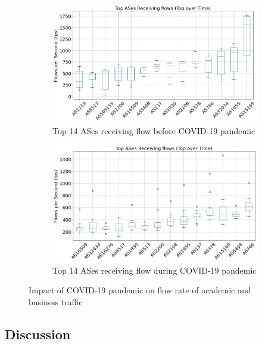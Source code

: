 \documentclass[10pt, journal, letterpaper]{IEEEtran}
\newcommand\linearFigSze{0.48}
\begin{document}
\begin{figure}
    \begin{subfigure}{\linearFigSze\textwidth}
          \centering
          \includegraphics[width=\columnwidth]{img/BCO2_top14AS_recieving_fps.png}
          \caption{Top 14 ASes receiving flow before COVID-19 pandemic}
          \label{fig:BCO2_topAS_rec_fps}
    \end{subfigure}
    \begin{subfigure}{\linearFigSze\textwidth}
          \centering
          \includegraphics[width=\columnwidth]{img/CO2_top14AS_recieving_fps.png}
          \caption{Top 14 ASes receiving flow during COVID-19 pandemic}
          \label{fig:CO2_topAS_rec_fps}
    \end{subfigure}
    \caption{Impact of COVID-19 pandemic on flow rate of academic and business traffic}
    \label{fig:flowrate_topAS_rec_BCO_CO}
\end{figure}
\subsection{Discussion}
\end{document}
